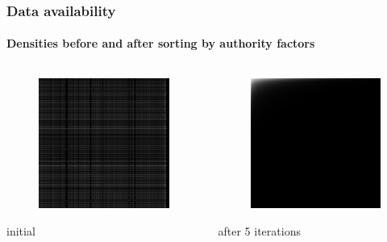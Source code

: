 \documentclass{beamer}
\begin{document}
\begin{frame}
\frametitle{Data availability}
\framesubtitle{Densities before and after sorting by authority factors}
\begin{columns}[T] %
\begin{column}{.48\textwidth}
\begin{figure}[h] 
    \includegraphics[width=5cm]{usual_grayscale_0.png}
\end{figure}
initial
\end{column}%
\hfill%
\begin{column}{.48\textwidth}
\begin{figure}[h] 
    \includegraphics[width=5cm]{usual_grayscale_5.png}
\end{figure}
after 5 iterations
\end{column}%
\end{columns}
\end{frame}
\end{document}
